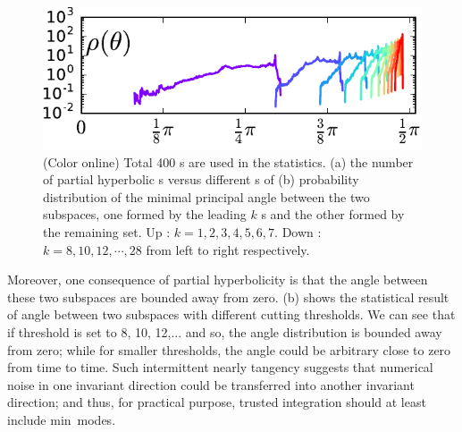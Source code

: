 \documentclass[prl,aps,preprint,showpacs]{revtex4-1} %
\begin{document}
\begin{figure}[h]
\begin{minipage}{.28\textwidth}
\begin{minipage}{\textwidth}
    \end{minipage}
    \begin{minipage}{\textwidth}
      \includegraphics[width=\textwidth]{tangency2}
    \end{minipage}
  \end{minipage}
  \caption{(Color online)
    Total 400 \po s are used in the statistics.
    (a) the number of partial hyperbolic \po s versus different
    \tph s of
    (b) probability distribution of
    the minimal principal angle between
    the two subspaces, one formed by the leading $k$ \Fv s and
    the other formed by the remaining set.
    Up : $k = 1, 2, 3, 4, 5, 6, 7$.
    Down : $k=8, 10, 12, \cdots, 28$ from left to right respectively.
  }
  \label{fig:angle}
\end{figure}

Moreover, one consequence of partial hyperbolicity is that
the angle between these two subspaces are bounded away from zero.
 (b)
shows the statistical result of angle between two subspaces
with different cutting thresholds.
We can see that if threshold is set to 8, 10, 12,... and so, the
angle distribution is bounded away from zero; while for smaller
thresholds, the angle could be arbitrary close to zero from time to
time.
Such intermittent nearly tangency suggests that numerical noise
in one invariant direction could be transferred into another invariant
direction; and thus, for practical purpose, trusted
integration should at least include min\tph\ modes.
\end{document}
